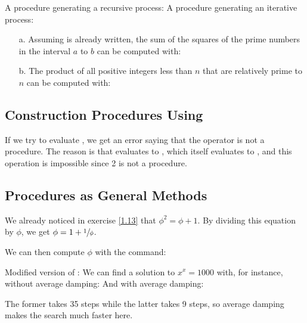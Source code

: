 \begin{exe}[1.33]
    A  procedure generating a recursive process:
    A  procedure generating an iterative process:
    \begin{itemize}
        \item[a.] Assuming  is already written, the sum of the 
            squares of the prime numbers in the interval $a$ to $b$ can be 
            computed with:
        \item[b.] The product of all positive integers less than $n$ that are 
            relatively prime to $n$ can be computed with:
    \end{itemize}
\end{exe}

\subsection{Construction Procedures Using }

\begin{exe}[1.34]
    If we try to evaluate , we get an error saying that the operator 
    is not a procedure. The reason is that  evaluates to
    , which itself evaluates to , and this operation is 
    impossible since 2 is not a procedure.
\end{exe}

\subsection{Procedures as General Methods}
\label{1.3.3}

\begin{exe}[1.35]
    We already noticed in exercise \ref{1.13} that $\phi^2 = \phi + 1$. By 
    dividing this equation by $\phi$, we get $\phi = 1 + \sfrac{1}{\phi}$.

    We can then compute $\phi$ with the command:
\end{exe}

\begin{exe}[1.36]
    Modified version of :
    We can find a solution to $x^x = 1000$ with, for instance, without average 
    damping:
    And with average damping:

    The former takes 35 steps while the latter takes 9 steps, so average damping 
    makes the search much faster here.
\end{exe}


